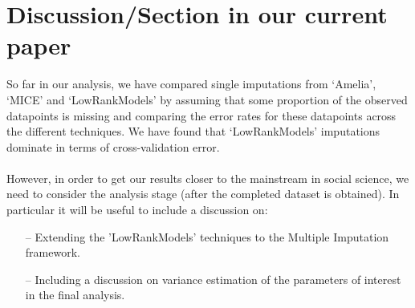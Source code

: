 \documentclass[11pt]{article} %
\begin{document}
\section{Discussion/Section in our current paper}
So far in our analysis, we have compared single imputations from `Amelia', `MICE' and `LowRankModels' by assuming that some proportion of the observed datapoints is missing and comparing the error rates for these datapoints across the different techniques.  We have found that `LowRankModels' imputations dominate in terms of cross-validation error.\\\\
However, in order to get our results closer to the mainstream in social science, we need to consider the analysis stage (after the completed dataset is obtained). In particular it will be useful to include a discussion on: 
\begin{itemize} 
\item[--] Extending the 'LowRankModels' techniques to the Multiple Imputation framework.
\item[--] Including a discussion on variance estimation of the parameters of interest in the final analysis. 
\end{itemize} 
\end{document}
